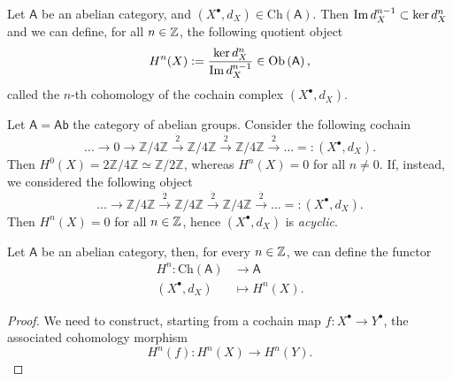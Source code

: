\begin{defn}[Cohomology]
	Let $\mathsf{A}$ be an abelian category, and $\left( X^{\bullet}, d_{X} \right) \in \mathrm{Ch}(\mathsf{A})$.
	Then $\operatorname{Im} d^{n-1}_X \subset \ker d_X^n$ and we can define, for all $n \in \mathbb{Z}$, the following quotient object
	\begin{equation}
		H^n(X) :=
		\frac{\ker d^n_X}{\operatorname{Im} d_X^{n-1}} \in \mathrm{Ob} \left(\mathsf{A}\right)
	,\end{equation} 
	called the $n$-th cohomology of the cochain complex $\left( X^{\bullet}, d_{X} \right)$.
\end{defn}

\begin{ex}
	Let $\mathsf{A} = \mathsf{Ab}$ the category of abelian groups.
	Consider the following cochain
	\begin{equation}
	\ldots \to 0 \to \mathbb{Z}/4\mathbb{Z} \xrightarrow{\dot{2}} \mathbb{Z}/4\mathbb{Z}
	\xrightarrow{\dot{2}} \mathbb{Z}/4\mathbb{Z} \xrightarrow{\dot{2}} \ldots
	=: \left( X^{\bullet}, d_{X} \right)	
	.\end{equation} 
	Then $H^0(X) = 2\mathbb{Z}/4\mathbb{Z} \simeq \mathbb{Z}/2\mathbb{Z}$, whereas
	$H^n(X) = 0$ for all $n \neq 0$.
	If, instead, we considered the following object
	\begin{equation}
	\ldots \to \mathbb{Z}/4\mathbb{Z} \xrightarrow{\dot{2}} \mathbb{Z}/4\mathbb{Z}
	\xrightarrow{\dot{2}} \mathbb{Z}/4\mathbb{Z} \xrightarrow{\dot{2}} \ldots
	=: \left( X^{\bullet}, d_{X} \right)	
	.\end{equation} 
	Then $H^n(X) = 0$ for all $n \in \mathbb{Z}$, hence $\left( X^{\bullet}, d_{X} \right)$ is \textit{acyclic}.
\end{ex}

\begin{prop}
	Let $\mathsf{A}$ be an abelian category, then, for every $n \in \mathbb{Z}$, we can define the functor
	\begin{align}
		H^n: \mathrm{Ch}(\mathsf{A}) &\to \mathsf{A} \\
		\left( X^{\bullet}, d_{X} \right) &\mapsto H^n(X)
	.\end{align}
\end{prop} 
\begin{proof}
	We need to construct, starting from a cochain map $f: X^{\bullet} \to Y^{\bullet}$, the associated cohomology morphism
	\begin{equation}
		H^n(f): H^n(X) \to H^n(Y)
	.\end{equation} 
\end{proof}

